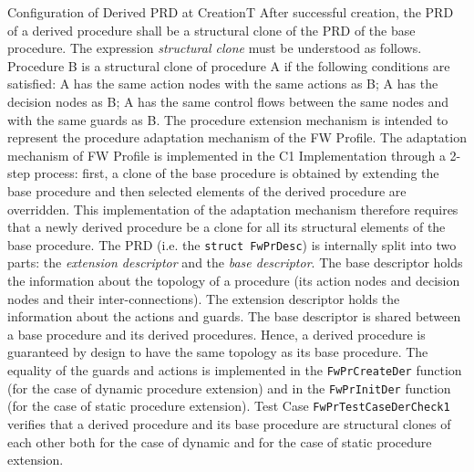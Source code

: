 \documentclass[a4paper,10pt]{article}
\newenvironment{fw_req_note}[7]
{\addtocounter{subsubsection}{1}
	\hspace{0.2cm}\textbf{FW-\arabic{section}.\arabic{subsection}.\arabic{subsubsection}/#2
	\hspace{0.8cm} #1}
	\vspace{-10pt}
\begin{longtable}{p{2.7cm}P{8.5cm}}
\hline
\textsc{Requirement} & #3 \\
\textsc{Note} & #4 \\
\textsc{Justification} & #5 \\
\textsc{Implementation} & #6  \\ 
\textsc{Verification} & #7  \\
\hline
}
{\end{longtable}}
\begin{document}
\begin{fw_req_note}{Configuration of Derived PRD at Creation}{T}
{After successful creation, the PRD of a derived procedure shall be a structural clone of the PRD of the base procedure.}
{The expression \emph{structural clone} must be understood as follows. Procedure B is a structural clone of procedure A if the following conditions are satisfied: A has the same action nodes with the same actions as B; A has the decision nodes as B; A has the same control flows between the same nodes and with the same guards as B.}
{The procedure extension mechanism is intended to represent the procedure adaptation mechanism of the FW Profile. 
The adaptation mechanism of FW Profile is implemented in the C1 Implementation through a 2-step process: first, a clone of the base procedure is 
obtained by extending the base procedure and then selected elements of the derived procedure are overridden. This implementation of the adaptation 
mechanism therefore requires that a newly derived procedure be a clone for all its structural elements of the base procedure.}
{The PRD (i.e. the \texttt{struct FwPrDesc}) is internally split into two parts: the \emph{extension descriptor} and the 
\emph{base descriptor}. The base descriptor holds the information about the topology of a procedure (its action nodes and decision nodes and 
their inter-connections). The extension descriptor holds the information about the actions and guards. The base descriptor 
is shared between a base procedure and its derived procedures. Hence, a derived procedure is guaranteed by design to have the same topology 
as its base procedure. The equality of the guards and actions  
is implemented in the \texttt{FwPrCreateDer} function (for the case of dynamic procedure extension) and in the \texttt{FwPrInitDer} function 
(for the case of static procedure extension).} 
{Test Case \texttt{FwPrTestCaseDerCheck1} verifies that a derived procedure and 
its base procedure are structural clones of each other both for the case of dynamic and for the case of 
static procedure extension.}
\end{fw_req_note}
\end{document}
